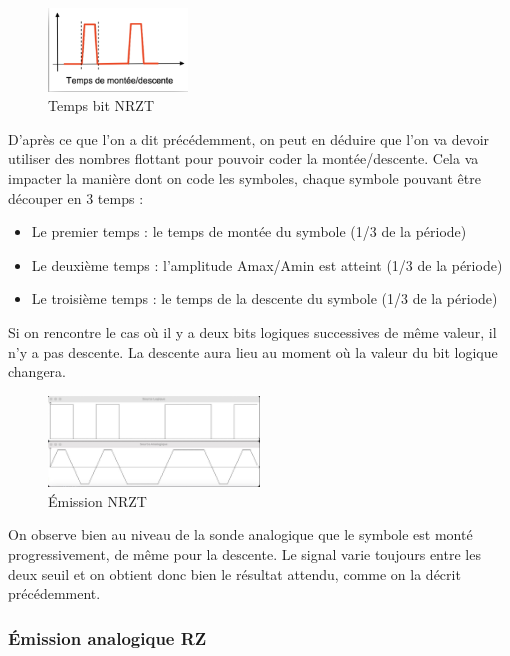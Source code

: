 \begin{figure}[H]
    \centering
    \includegraphics[width=0.33\textwidth]{img/etape2_temps_NRZT.png}
    \caption{Temps bit NRZT}
    \label{fig:temps_de_bit_nrzt}
\end{figure}

D’après ce que l’on a dit précédemment, on peut en déduire que l’on va devoir utiliser des nombres flottant pour pouvoir coder la montée/descente. Cela va impacter la manière dont on code les symboles, chaque symbole pouvant être découper en 3 temps :

\begin{itemize}
    \item Le premier temps : le temps de montée du symbole (1/3 de la période)
    \item Le deuxième temps : l’amplitude Amax/Amin est atteint (1/3 de la période)
    \item Le troisième temps : le temps de la descente du symbole (1/3 de la période)
\end{itemize}

Si on rencontre le cas où il y a deux bits logiques successives de même valeur, il n’y a pas descente. La descente aura lieu au moment où la valeur du bit logique changera.

\begin{figure}[H]
    \centering
    \includegraphics[width=0.5\textwidth]{img/etape2_emission_NRZT.png}
    \caption{Émission NRZT}
    \label{fig:emission_nrzt}
\end{figure}

On observe bien au niveau de la sonde analogique que le symbole est monté progressivement, de même pour la descente. Le signal varie toujours entre les deux seuil et on obtient donc bien le résultat attendu, comme on la décrit précédemment.



\subsubsection{Émission analogique RZ}

